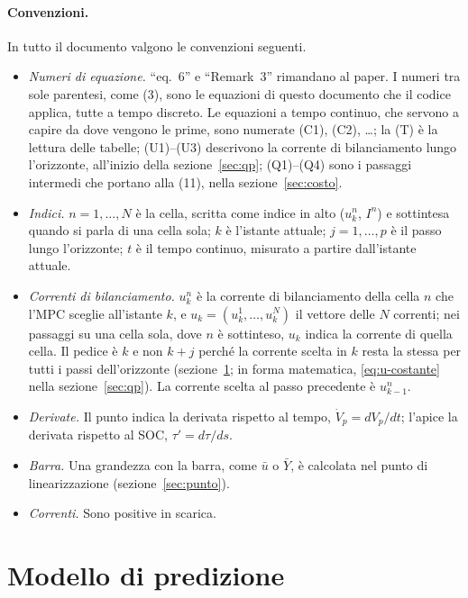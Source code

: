 \documentclass[11pt,a4paper]{article}
\begin{document}
\paragraph{Convenzioni.} In tutto il documento valgono le convenzioni
seguenti.
\begin{itemize}
  \item \emph{Numeri di equazione.} ``eq.~6'' e ``Remark~3'' rimandano al
        paper. I numeri tra sole parentesi, come (3), sono le equazioni di
        questo documento che il codice applica, tutte a tempo discreto. Le
        equazioni a tempo continuo, che servono a capire da dove vengono le
        prime, sono numerate (C1), (C2), \dots; la (T) è la lettura delle
        tabelle; (U1)--(U3) descrivono la corrente di bilanciamento lungo
        l'orizzonte, all'inizio della sezione~\ref{sec:qp}; (Q1)--(Q4) sono i
        passaggi intermedi che portano alla (11), nella
        sezione~\ref{sec:costo}.
  \item \emph{Indici.} $n = 1,\dots,N$ è la cella, scritta come indice in alto
        ($u^n_k$, $I^n$) e sottintesa quando si parla di una cella sola; $k$ è
        l'istante attuale; $j = 1,\dots,p$ è il passo lungo l'orizzonte; $t$ è
        il tempo continuo, misurato a partire dall'istante attuale.
  \item \emph{Correnti di bilanciamento.} $u^n_k$ è la corrente di
        bilanciamento della cella $n$ che l'MPC sceglie all'istante $k$, e
        $u_k = (u^1_k, \dots, u^N_k)$ il vettore delle $N$ correnti; nei
        passaggi su una cella sola, dove $n$ è sottinteso, $u_k$ indica la
        corrente di quella cella. Il pedice è $k$ e non $k+j$ perché la
        corrente scelta in $k$ resta la stessa per tutti i passi
        dell'orizzonte (sezione~\ref{sec:modello}; in forma matematica,
        \eqref{eq:u-costante} nella sezione~\ref{sec:qp}). La corrente scelta
        al passo precedente è $u^n_{k-1}$.
  \item \emph{Derivate.} Il punto indica la derivata rispetto al tempo,
        $\dot V_p = dV_p/dt$; l'apice la derivata rispetto al SOC,
        $\tau' = d\tau/ds$.
  \item \emph{Barra.} Una grandezza con la barra, come $\bar u$ o $\bar Y$, è
        calcolata nel punto di linearizzazione (sezione~\ref{sec:punto}).
  \item \emph{Correnti.} Sono positive in scarica.
\end{itemize}

\section{Modello di predizione}\label{sec:modello}
\end{document}
